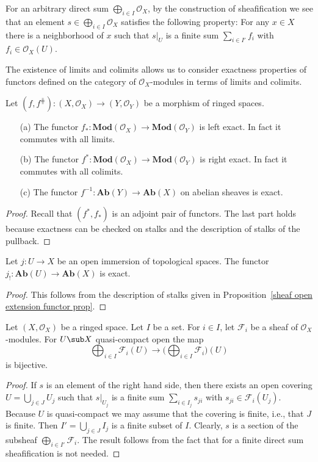 \begin{remark}
For an arbitrary direct sum $\bigoplus_{i\in I}\mathscr{O}_X$, by the construction of sheafification we see that an element $s\in\bigoplus_{i\in I}\mathscr{O}_X$ satisfies the following property: For any $x\in X$ there is a neighborhood of $x$ such that $s|_U$ is a finite sum $\sum_{i\in I'}f_i$ with $f_i\in\mathscr{O}_X(U)$.
\end{remark}
The existence of limits and colimits allows us to consider exactness properties of functors defined on the category of $\mathscr{O}_X$-modules in terms of limits and colimits.
\begin{proposition}\label{ringed space morphism pullback pushforward exactness}
Let $(f,f^{\hash}):(X,\mathscr{O}_X)\to(Y,\mathscr{O}_Y)$ be a morphism of ringed spaces.
\begin{itemize}
\item[(a)] The functor $f_*:\mathbf{Mod}(\mathscr{O}_X)\to\mathbf{Mod}(\mathscr{O}_Y)$ is left exact. In fact it commutes with all limits.
\item[(b)] The functor $f^*:\mathbf{Mod}(\mathscr{O}_X)\to\mathbf{Mod}(\mathscr{O}_Y)$ is right exact. In fact it commutes with all colimits.
\item[(c)] The functor $f^{-1}:\mathbf{Ab}(Y)\to\mathbf{Ab}(X)$ on abelian sheaves is exact.
\end{itemize}
\end{proposition}
\begin{proof}
Recall that $(f^*,f_*)$ is an adjoint pair of functors. The last part holds because exactness can be checked on stalks and the description of stalks of the pullback.
\end{proof}
\begin{proposition}
Let $j:U\to X$ be an open immersion of topological spaces. The functor $j_!:\mathbf{Ab}(U)\to\mathbf{Ab}(X)$ is exact.
\end{proposition}
\begin{proof}
This follows from the description of stalks given in Proposition~\ref{sheaf open extension functor prop}.
\end{proof}
\begin{proposition}\label{sheaf module quasi-compact sum}
Let $(X,\mathscr{O}_X)$ be a ringed space. Let $I$ be a set. For $i\in I$, let $\mathscr{F}_i$ be a sheaf of $\mathscr{O}_X$-modules. For $U\sub X$ quasi-compact open the map 
\[\bigoplus_{i\in I}\mathscr{F}_i(U)\to\Big(\bigoplus_{i\in I}\mathscr{F}_i\Big)(U)\]
is bijective.
\end{proposition}
\begin{proof}
If $s$ is an element of the right hand side, then there exists an open covering $U=\bigcup_{j\in J}U_j$ such that $s|_{U_j}$ is a finite sum $\sum_{i\in I_j}s_{ji}$ with $s_{ji}\in\mathscr{F}_i(U_j)$. Because $U$ is quasi-compact we may assume that the covering is finite, i.e., that $J$ is finite. Then $I'=\bigcup_{j\in J}I_j$ is a finite subset of $I$. Clearly, $s$ is a section of the subsheaf $\bigoplus_{i\in I'}\mathscr{F}_i$. The result follows from the fact that for a finite direct sum sheafification
is not needed.
\end{proof}
